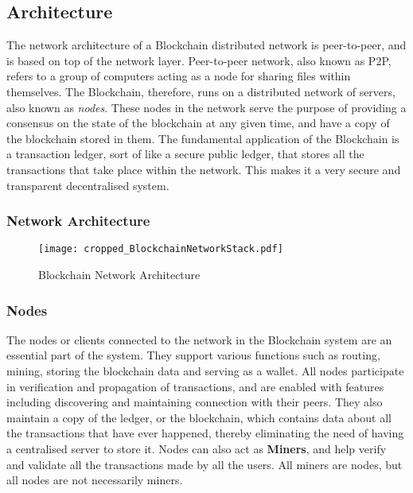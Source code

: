 \documentclass[english]{tktltiki}
\begin{document}
\subsection{Architecture}

The network architecture of a Blockchain distributed network is peer-to-peer, and is based on top of the network layer. Peer-to-peer network, also known as P2P, refers to a group of computers acting as a node for sharing files within themselves. The Blockchain, therefore, runs on a distributed network of servers, also known as \textit{nodes}. These nodes in the network serve the purpose of providing a consensus on the state of the blockchain at any given time, and have a copy of the blockchain stored in them. The fundamental application of the Blockchain is a transaction ledger, sort of like a secure public ledger, that stores all the transactions that take place within the network. This makes it a very secure and transparent decentralised system. 

\subsubsection{Network Architecture}


\begin{figure}[H]
\begin{center}
\texttt{[image: cropped\_BlockchainNetworkStack.pdf]}
\caption{Blockchain Network Architecture}
\label{Blockchain Network Architecture}
\end{center}
\end{figure}

\subsubsection{Nodes}
The nodes or clients connected to the network in the Blockchain system are an essential part of the system. They support various functions such as routing, mining, storing the blockchain data and serving as a wallet. All nodes participate in verification and propagation of transactions, and are enabled with features including discovering and maintaining connection with their peers. They also maintain a copy of the ledger, or the blockchain, which contains data about all the transactions that have ever happened, thereby eliminating the need of having a centralised server to store it. 
Nodes can also act as \textbf{Miners}, and help verify and validate all the transactions made by all the users. All miners are nodes, but all nodes are not necessarily miners.
\end{document}
